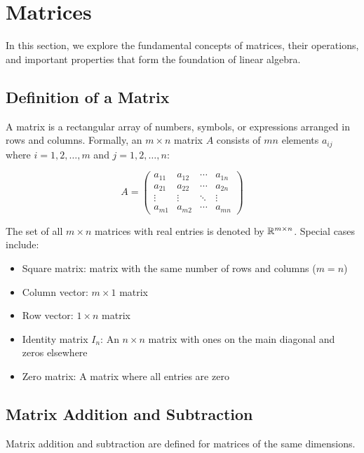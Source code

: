 \newpage
\section{Matrices}

In this section, we explore the fundamental concepts of matrices, their operations, and important properties that form the foundation of linear algebra.

\subsection{Definition of a Matrix}

A matrix is a rectangular array of numbers, symbols, or expressions arranged in rows and columns. Formally, an \(m \times n\) matrix \(A\) consists of \(mn\) elements \(a_{ij}\) where \(i = 1, 2, \ldots, m\) and \(j = 1, 2, \ldots, n\):

\[
    A = 
    \begin{pmatrix}
    a_{11} & a_{12} & \cdots & a_{1n} \\
    a_{21} & a_{22} & \cdots & a_{2n} \\
    \vdots & \vdots & \ddots & \vdots \\
    a_{m1} & a_{m2} & \cdots & a_{mn}
    \end{pmatrix}
\]

The set of all \(m \times n\) matrices with real entries is denoted by \(\mathbb{R}^{m \times n}\). Special cases include:

\begin{itemize}
    \item Square matrix: matrix with the same number of rows and columns (\(m = n\))
    \item Column vector: \(m \times 1\) matrix
    \item Row vector: \(1 \times n\) matrix
    \item Identity matrix \(I_n\): An \(n \times n\) matrix with ones on the main diagonal and zeros elsewhere
    \item Zero matrix: A matrix where all entries are zero
\end{itemize}

\subsection{Matrix Addition and Subtraction}

Matrix addition and subtraction are defined for matrices of the same dimensions.

